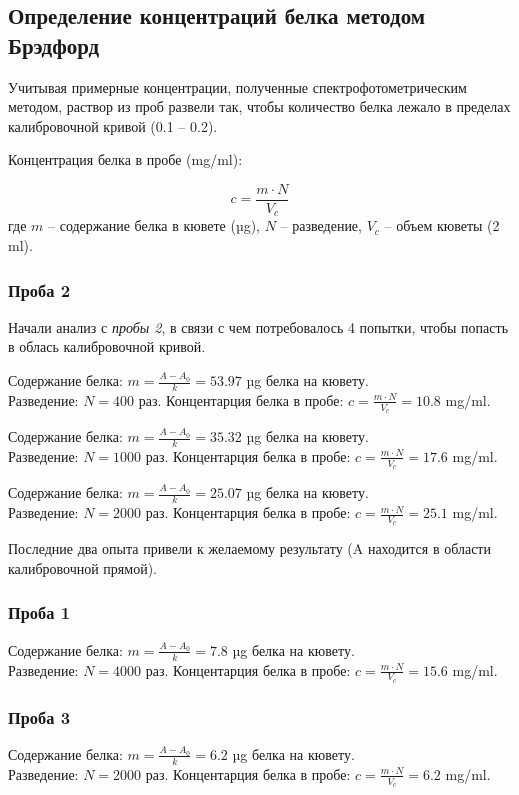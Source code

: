 \subsection{Определение концентраций белка методом Брэдфорд}

Учитывая примерные концентрации, полученные спектрофотометрическим методом,
раствор из проб развели так, чтобы количество белка лежало в пределах
калибровочной кривой (0.1 -- 0.2).

Концентрация белка в пробе (mg/ml):

$$ c = \frac{m \cdot N}{V_c} $$
где $m$ -- содержание белка в кювете (µg),
$N$ -- разведение,
$V_c$ -- объем кюветы (2 ml).

\subsubsection{Проба 2}
Начали анализ с \emph{пробы 2}, в связи с чем потребовалось 4 попытки,
чтобы попасть в облась калибровочной кривой.

\def\svgwidth{\linewidth}

\def\svgwidth{\linewidth}
Содержание белка: $ m = \frac{A-A_0}{k} = 53.97 $ µg белка на кювету. \\
Разведение: $ N = 400 $ раз.
Концентарция белка в пробе: $ c = \frac{m \cdot N}{V_c} = 10.8 $ mg/ml.

\def\svgwidth{\linewidth}
Содержание белка: $ m = \frac{A-A_0}{k} = 35.32 $ µg белка на кювету. \\
Разведение: $ N = 1000 $ раз.
Концентарция белка в пробе: $ c = \frac{m \cdot N}{V_c} = 17.6 $ mg/ml.

\def\svgwidth{\linewidth}
Содержание белка: $ m = \frac{A-A_0}{k} = 25.07 $ µg белка на кювету. \\
Разведение: $ N = 2000 $ раз.
Концентарция белка в пробе: $ c = \frac{m \cdot N}{V_c} = 25.1 $ mg/ml.

Последние два опыта привели к желаемому результату
(A находится в области калибровочной прямой).

\subsubsection{Проба 1}
\def\svgwidth{\linewidth}
Содержание белка: $ m = \frac{A-A_0}{k} = 7.8 $ µg белка на кювету. \\
Разведение: $ N = 4000 $ раз.
Концентарция белка в пробе: $ c = \frac{m \cdot N}{V_c} = 15.6 $ mg/ml.

\subsubsection{Проба 3}
\def\svgwidth{\linewidth}
Содержание белка: $ m = \frac{A-A_0}{k} = 6.2 $ µg белка на кювету. \\
Разведение: $ N = 2000 $ раз.
Концентарция белка в пробе: $ c = \frac{m \cdot N}{V_c} = 6.2 $ mg/ml.

